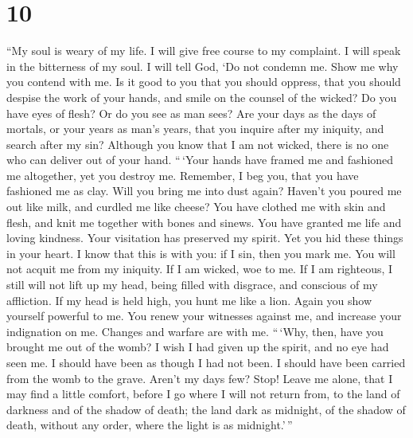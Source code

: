 \hypertarget{section-9}{%
\section{10}\label{section-9}}

 ``My soul is weary of my life. I will give free course to
my complaint. I will speak in the bitterness of my soul. 
I will tell God, `Do not condemn me. Show me why you contend with me.
 Is it good to you that you should oppress, that you
should despise the work of your hands, and smile on the counsel of the
wicked?  Do you have eyes of flesh? Or do you see as man
sees?  Are your days as the days of mortals, or your years
as man's years,  that you inquire after my iniquity, and
search after my sin?  Although you know that I am not
wicked, there is no one who can deliver out of your hand. 
``\,`Your hands have framed me and fashioned me altogether, yet you
destroy me.  Remember, I beg you, that you have fashioned
me as clay. Will you bring me into dust again?  Haven't
you poured me out like milk, and curdled me like cheese? 
You have clothed me with skin and flesh, and knit me together with bones
and sinews.  You have granted me life and loving
kindness. Your visitation has preserved my spirit.  Yet
you hid these things in your heart. I know that this is with you:
 if I sin, then you mark me. You will not acquit me from
my iniquity.  If I am wicked, woe to me. If I am
righteous, I still will not lift up my head, being filled with disgrace,
and conscious of my affliction.  If my head is held high,
you hunt me like a lion. Again you show yourself powerful to me.
 You renew your witnesses against me, and increase your
indignation on me. Changes and warfare are with me. 
``\,`Why, then, have you brought me out of the womb? I wish I had given
up the spirit, and no eye had seen me.  I should have
been as though I had not been. I should have been carried from the womb
to the grave.  Aren't my days few? Stop! Leave me alone,
that I may find a little comfort,  before I go where I
will not return from, to the land of darkness and of the shadow of
death;  the land dark as midnight, of the shadow of
death, without any order, where the light is as midnight.'\,''

